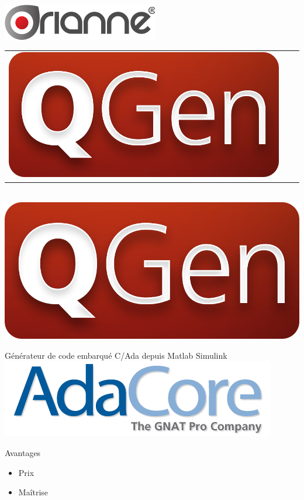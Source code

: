 \documentclass[xcolor=x11names,compress]{beamer}
\begin{document}
\begin{frame}{\vspace{-17pt}\\\includegraphics[scale=0.34]{images/orianne}}
\begin{center}
{\begin{tabular}[h]{m{110pt}m{53pt}m{125pt}}
	  \includegraphics[scale=0.1]{images/qgen} \\
	  \end{tabular}
	}
  \end{center}
\end{frame}

\begin{frame}{\vspace{-17pt}\\\includegraphics[scale=0.04]{images/qgen}}
  \begin{center}
	Générateur de code embarqué C/Ada depuis Matlab Simulink\\
	\vfill
	\includegraphics[scale=0.2]{images/adacore.png}\\
	\vfill
	\begin{block}{Avantages}{}
	  \begin{itemize}
		\item Prix
		\item Maîtrise
	  \end{itemize}
	\end{block}
  \end{center}
\end{frame}
\end{document}
